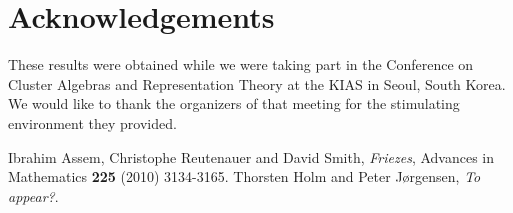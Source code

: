 \documentclass{amsart}
\begin{document}
\section*{Acknowledgements}
  These results were obtained while we were taking part in the Conference on Cluster Algebras and Representation Theory at the KIAS in Seoul, South Korea. 
  We would like to thank the organizers of that meeting for the stimulating environment they provided.

\begin{thebibliography}{99}
   Ibrahim Assem, Christophe Reutenauer and David Smith, \emph{Friezes}, Advances in Mathematics {\bf 225} (2010) 3134-3165.
   Thorsten Holm and Peter J\o rgensen, \emph{To appear?}.
\end{thebibliography}
\end{document}
